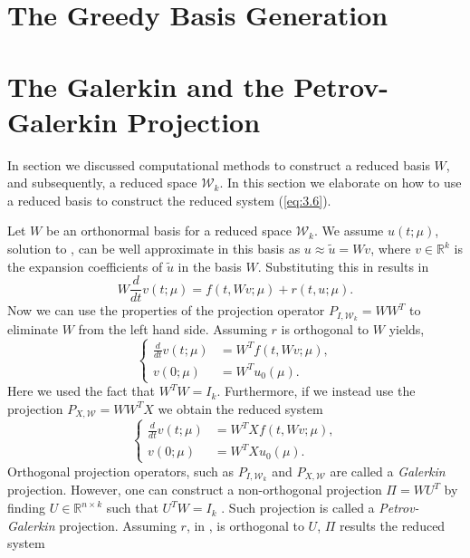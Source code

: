 \section{The Greedy Basis Generation} \label{sec:3.3}

\section{The Galerkin and the Petrov-Galerkin Projection} In section  we discussed computational methods to construct a reduced basis $W$, and subsequently, a reduced space $\mathcal W_k$. In this section we elaborate on how to use a reduced basis to construct the reduced system (\ref{eq:3.6}).

Let $W$ be an orthonormal basis for a reduced space $\mathcal W_k$. We assume $u(t;\mu)$, solution to , can be well approximate in this basis as $u \approx \tilde u = W v$, where $v\in \mathbb R^{k}$ is the expansion coefficients of $\tilde u$ in the basis $W$. Substituting this in 
 results in
\begin{equation} \label{eq:3.25}
	W \frac{d}{dt} v(t;\mu) = f(t,Wv;\mu) + r(t,u;\mu).
\end{equation}
Now we can use the properties of the projection operator $P_{I,\mathcal W_k} = WW^T$ to eliminate $W$ from the left hand side. Assuming $r$ is orthogonal to $W$ yields,
\begin{equation} \label{eq:3.26}
	\left\{
	\begin{aligned}
	\frac{d}{dt} v(t;\mu) &= W^T f(t,Wv;\mu), \\
	v(0;\mu) &= W^T u_0(\mu).
	\end{aligned}
	\right.
\end{equation}
Here we used the fact that $W^TW = I_k$. Furthermore, if we instead use the projection $P_{X,\mathcal W} = WW^TX$ we obtain the reduced system
\begin{equation} \label{eq:3.27}
	\left\{
	\begin{aligned}
	\frac{d}{dt} v(t;\mu) &= W^T X f(t,Wv;\mu), \\
	v(0;\mu) &= W^T X u_0(\mu).
	\end{aligned}
	\right.
\end{equation}
Orthogonal projection operators, such as $P_{I,\mathcal W_k}$ and $P_{X,\mathcal W}$ are called a \emph{Galerkin} projection. However, one can construct a non-orthogonal projection $\Pi = WU^T$ by finding $U\in \mathbb R^{n\times k}$ such that $U^TW = I_k$ \cite{hesthaven2015certified,quarteroni2015reduced,doi:10.1137/1.9780898718713}. Such projection is called a \emph{Petrov-Galerkin} projection. Assuming $r$, in , is orthogonal to $U$, $\Pi$ results the reduced system

